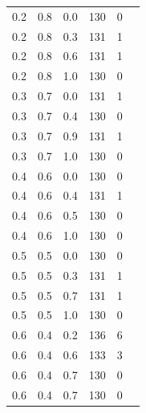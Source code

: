 \documentclass[12pt]{report}
\begin{document}
\begin{table}[H]
\begin{center}
\begin{tabular}{|c@{\hspace{7mm}}|c@{\hspace{7mm}}|c@{\hspace{7mm}}|c@{\hspace{7mm}}|c@{\hspace{7mm}}|c|}
			0.2  & 0.8  & 0.0    & 130    & 0     \\
			0.2  & 0.8  & 0.3    & 131    & 1     \\
			0.2  & 0.8  & 0.6    & 131    & 1     \\
			0.2  & 0.8  & 1.0    & 130    & 0     \\
			\hline
			0.3  & 0.7  & 0.0  & 131    & 1     \\
			0.3  & 0.7  & 0.4  & 130    & 0     \\
			0.3  & 0.7  & 0.9  & 131    & 1     \\
			0.3  & 0.7  & 1.0  & 130    & 0     \\
			\hline
			0.4  & 0.6  & 0.0  & 130    & 0     \\
			0.4  & 0.6  & 0.4  & 131    & 1     \\
			0.4  & 0.6  & 0.5  & 130    & 0     \\
			0.4  & 0.6  & 1.0  & 130    & 0     \\
			\hline
			0.5  & 0.5  & 0.0  & 130    & 0     \\
			0.5  & 0.5  & 0.3  & 131    & 1     \\
			0.5  & 0.5  & 0.7  & 131    & 1     \\
			0.5  & 0.5  & 1.0  & 130    & 0     \\
			\hline
			0.6  & 0.4  & 0.2  & 136    & 6     \\
			0.6  & 0.4  & 0.6  & 133    & 3     \\
			0.6  & 0.4  & 0.7  & 130    & 0     \\
			0.6  & 0.4  & 0.7  & 130    & 0     \\
			\hline
		\end{tabular}
	\end{center}
\end{table}
\end{document}
